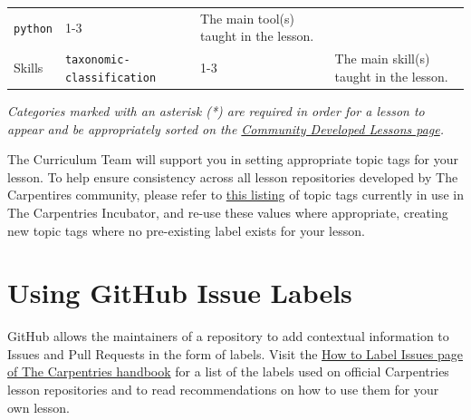 \documentclass[
]{book}
\begin{document}
\begin{longtable}[]{@{}llll@{}}
\begin{minipage}[t]{0.20\columnwidth}
\texttt{python}\strut
\end{minipage} & \begin{minipage}[t]{0.18\columnwidth}\raggedright
1-3\strut
\end{minipage} & \begin{minipage}[t]{0.29\columnwidth}\raggedright
The main tool(s) taught in the lesson.\strut
\end{minipage}\tabularnewline
\begin{minipage}[t]{0.22\columnwidth}\raggedright
Skills\strut
\end{minipage} & \begin{minipage}[t]{0.20\columnwidth}\raggedright
\texttt{taxonomic-classification}\strut
\end{minipage} & \begin{minipage}[t]{0.18\columnwidth}\raggedright
1-3\strut
\end{minipage} & \begin{minipage}[t]{0.29\columnwidth}\raggedright
The main skill(s) taught in the lesson.\strut
\end{minipage}\tabularnewline
\bottomrule
\end{longtable}

\emph{Categories marked with an asterisk (*) are required in order for a lesson to appear and be appropriately sorted on the \href{https://carpentries.org/community-lessons/}{Community Developed Lessons page}.}

The Curriculum Team will support you in setting appropriate topic tags for your lesson.
To help ensure consistency across all lesson repositories
developed by The Carpentires community,
please refer to \href{https://docs.google.com/spreadsheets/d/1KkmBtCu4PaNb5nzJAD82UHcfHQlaPY84qPVxw8WO8es/edit?usp=sharing}{this listing} of topic tags currently
in use in The Carpentries Incubator,
and re-use these values where appropriate,
creating new topic tags where no pre-existing label exists for your lesson.

\hypertarget{using-github-issue-labels}{%
\section{Using GitHub Issue Labels}\label{using-github-issue-labels}}

GitHub allows the maintainers of a repository to add contextual information to Issues and Pull Requests in the form of labels.
Visit the \href{https://docs.carpentries.org/topic_folders/maintainers/github_labels.html}{How to Label Issues page of The Carpentries handbook} for a list of the labels used on official Carpentries lesson repositories and to read recommendations on how to use them for your own lesson.
\end{document}
